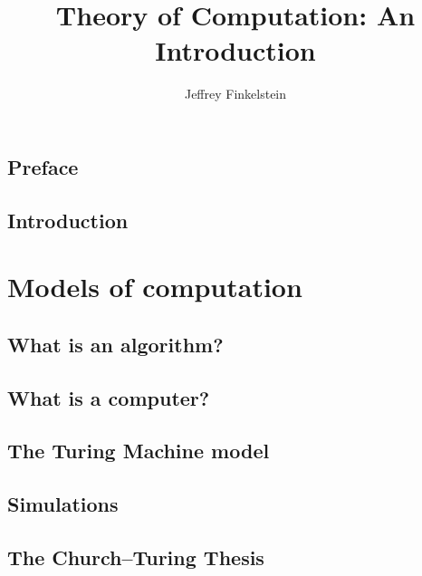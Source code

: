 \documentclass{book}
\title{Theory of Computation: An Introduction}
\author{Jeffrey Finkelstein}
\newcommand{\makehalftitle}{
  {\centering \Large
    \vspace*{5em}
    \textsc{\THETITLE}
  }
}
\begin{document}
\frontmatter

\makehalftitle


\maketitle



\newpage


\tableofcontents

\chapter{Preface} 
\chapter{Introduction} 

\newpage


\newpage
\makehalftitle

\mainmatter

\part{Models of computation} 

\chapter{What is an algorithm?} 
\chapter{What is a computer?} 
\chapter{The Turing Machine model} 
\chapter{Simulations} 
\chapter{The Church--Turing Thesis} 
\end{document}
